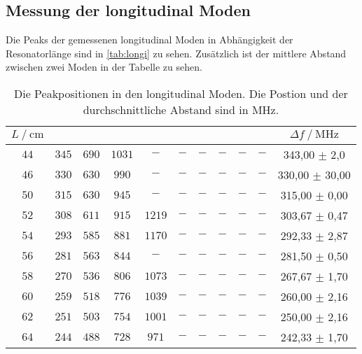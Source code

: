 \subsection{Messung der longitudinal Moden}
\label{sec:Stab_be}
Die Peaks der gemessenen longitudinal Moden in Abhängigkeit der Resonatorlänge sind in \autoref{tab:longi} zu sehen.
Zusätzlich ist der mittlere Abstand zwischen zwei Moden in der Tabelle zu sehen.

\begin{table}[H]
    \centering
    \caption{Die Peakpositionen in den longitudinal Moden. Die Postion und der durchschnittliche Abstand sind in $\unit{\mega\hertz}$.}
    \label{tab:longi}
    \begin{tabular}{c c c c c c c c c c | S[table-format=3.2]}
    \toprule
      $L \mathbin{/} \unit{\centi\meter}$ & & & & & & & & & & $\Delta f \mathbin{/}  \unit{\mega\hertz}$   \\
    \midrule
        $44$ &  $345$ & $690$ &$ 1031$ & $-   $ & $-    $ & $-   $ & $-   $ & $-   $ &  $-   $ &   {343,00 $\pm$ 2,0}  \\
        $46$ &  $330$ & $630$ &$ 990$  & $-   $ & $-    $ & $-   $ & $-   $ & $-   $ &  $-   $ &   {330,00 $\pm$ 30,00} \\
        $50$ &  $315$ & $630$ &$ 945$  & $-   $ & $-    $ & $-   $ & $-   $ & $-   $ &  $-   $ &   {315,00 $\pm$ 0,00}  \\
        $52$ &  $308$ & $611$ &$ 915$  & $1219$ & $-    $ & $-   $ & $-   $ & $-   $ &  $-   $ &   {303,67 $\pm$ 0,47}  \\
        $54$ &  $293$ & $585$ &$ 881$  & $1170$ & $-    $ & $-   $ & $-   $ & $-   $ &  $-   $ &   {292,33 $\pm$ 2,87}  \\
        $56$ &  $281$ & $563$ &$ 844$  & $-   $ & $-    $ & $-   $ & $-   $ & $-   $ &  $-   $ &   {281,50 $\pm$ 0,50}  \\
        $58$ &  $270$ & $536$ &$ 806$  & $1073$ & $-    $ & $-   $ & $-   $ & $-   $ &  $-   $ &   {267,67 $\pm$ 1,70}  \\
        $60$ &  $259$ & $518$ &$ 776$  & $1039$ & $-    $ & $-   $ & $-   $ & $-   $ &  $-   $ &   {260,00 $\pm$ 2,16}  \\
        $62$ &  $251$ & $503$ &$ 754$  & $1001$ & $-    $ & $-   $ & $-   $ & $-   $ &  $-   $ &   {250,00 $\pm$ 2,16}  \\
        $64$ &  $244$ & $488$ &$ 728$  & $971 $ & $-    $ & $-   $ & $-   $ & $-   $ &  $-   $ &   {242,33 $\pm$ 1,70}  \\

\end{tabular}
\end{table}
